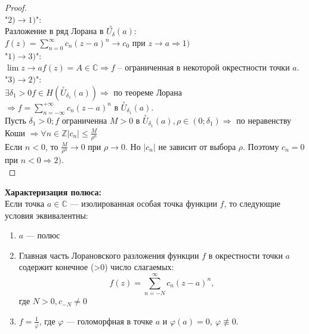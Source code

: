 \begin{proof}
    \ \\
    "$2)\to 1)$":\\
    Разложение в ряд Лорана в $\overset{\circ}{U_{\delta}}(a):$\\
    $f(z)=\sum_{n=0}^\infty c_n(z-a)^n \to c_0$ при $z\to a \Rightarrow 1)$\\[2mm]
    "$1) \to 3)$":\\
    $\lim\limits{z\to a}f(z)=A\in\mathbb{C} \Rightarrow f$ -- ограниченная в некоторой окрестности точки $a$.\\[2mm]
    "$3) \to 2) $":\\
    $\exists \delta_1 >0 f\in H(\overset{\circ}{U}_{\delta_1}(a)) \Rightarrow$ по теореме Лорана\\
    $\Rightarrow f=\sum_{n=-\infty}^{+\infty}c_n(z-a)^n$ в $\overset{\circ}{U}_{\delta_1}(a).$\\
    Пусть $\delta_1 > 0; f$ ограниченна $M>0$ в $\overset{\circ}{U}_{\delta_1}(a), \rho \in (0; \delta_1)\Rightarrow$ по неравенству Коши $\Rightarrow \forall n\in\mathbb{Z} |c_n|\leq \frac{M}{\rho^n}$\\
    Если $n<0$, то $\frac{M}{\rho^n} \to 0$ при $\rho \to 0$. Но $|c_n|$ не зависит от выбора $\rho$. Поэтому $c_n = 0$ при $n<0 \Rightarrow 2)$.\\[2mm]
\end{proof}

\textbf{Характеризация полюса:}\\
Если точка $a\in \mathbb{C}$ --- изолированная особая точка функции $f$, то следующие условия эквивалентны:
\begin{enumerate}
    \item $a$ --- полюс
    \item Главная часть Лорановского разложения функции $f$ в окрестности точки $a$ содержит конечное (>0) число слагаемых:
    $$f(z)=\sum_{n=-N}^\infty c_n(z-a)^n,$$
    где $N>0, c_{-N}\neq 0$ 
    \item $f=\frac{1}{\varphi}$, где $\varphi$ --- голоморфная в точке $a$ и $\varphi(a) = 0, \ \varphi \not\equiv 0$.
\end{enumerate}

